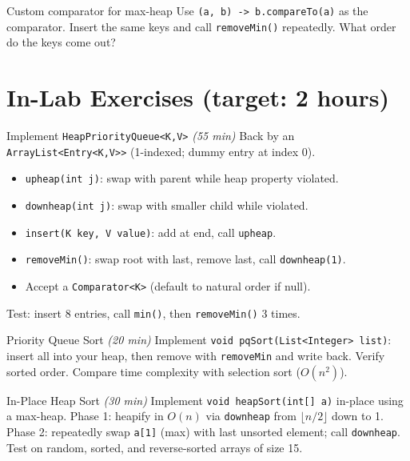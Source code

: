 \documentclass[11pt]{article}
\begin{document}
\begin{tryit}{Custom comparator for max-heap}
Use \texttt{(a, b) -> b.compareTo(a)} as the comparator.
Insert the same keys and call \texttt{removeMin()} repeatedly.
What order do the keys come out?
\end{tryit}

\section*{In-Lab Exercises (target: 2 hours)}

\begin{labexercise}{Implement \texttt{HeapPriorityQueue<K,V>} \hfill {\small \itshape (55 min)}}
Back by an \texttt{ArrayList<Entry<K,V>>} (1-indexed; dummy entry at index 0).
\begin{itemize}[leftmargin=*,nosep]
  \item \texttt{upheap(int j)}: swap with parent while heap property violated.
  \item \texttt{downheap(int j)}: swap with smaller child while violated.
  \item \texttt{insert(K key, V value)}: add at end, call \texttt{upheap}.
  \item \texttt{removeMin()}: swap root with last, remove last, call \texttt{downheap(1)}.
  \item Accept a \texttt{Comparator<K>} (default to natural order if null).
\end{itemize}
Test: insert 8 entries, call \texttt{min()}, then \texttt{removeMin()} 3 times.
\end{labexercise}

\begin{labexercise}{Priority Queue Sort \hfill {\small \itshape (20 min)}}
Implement \texttt{void pqSort(List<Integer> list)}: insert all into your heap, then
remove with \texttt{removeMin} and write back.
Verify sorted order. Compare time complexity with selection sort ($O(n^2)$).
\end{labexercise}

\begin{labexercise}{In-Place Heap Sort \hfill {\small \itshape (30 min)}}
Implement \texttt{void heapSort(int[] a)} in-place using a max-heap.
Phase 1: heapify in $O(n)$ via \texttt{downheap} from $\lfloor n/2 \rfloor$ down to 1.
Phase 2: repeatedly swap \texttt{a[1]} (max) with last unsorted element; call \texttt{downheap}.
Test on random, sorted, and reverse-sorted arrays of size 15.
\end{labexercise}
\end{document}
